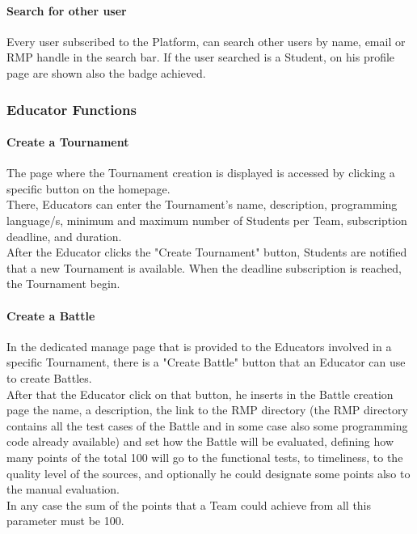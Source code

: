 \paragraph{Search for other user}
Every user subscribed to the Platform, can search other users by name, email or RMP handle in the search bar. If the user searched is a Student, on his profile page are shown also the badge achieved.

\subsubsection{Educator Functions}
\paragraph{Create a Tournament}
The page where the Tournament creation is displayed is accessed by clicking a specific button on the homepage.\\
There, Educators can enter the Tournament's name, description, programming language/s, minimum and maximum number of Students per Team, subscription deadline, and duration.\\ 
After the Educator clicks the "Create Tournament" button, Students are notified that a new Tournament is available.
When the deadline subscription is reached, the Tournament begin.
\paragraph{Create a Battle}
In the dedicated manage page that is provided to the Educators involved in a specific Tournament, there is a "Create Battle" button that an Educator can use to create Battles.\\
After that the Educator click on that button, he inserts in the Battle creation page the name, a description, the link to the RMP directory (the RMP directory contains all the test cases of the Battle
and in some case also some programming code already available) and set how the Battle will be evaluated, defining how many points of the total 100 will go to the functional tests, to timeliness, to 
the quality level of the sources, and optionally he could designate some points also to the manual evaluation.\\
In any case the sum of the points that a Team could achieve from all this parameter must be 100.
